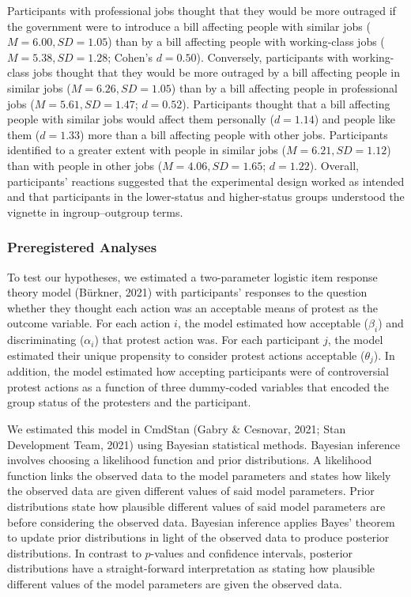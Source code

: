 \documentclass[twocolumn, 11pt, letterpaper]{article}
\begin{document}
Participants with professional jobs thought that they would be more
outraged if the government were to introduce a bill affecting people
with similar jobs (\(M = 6.00, SD = 1.05\)) than by a bill affecting
people with working-class jobs (\(M = 5.38, SD = 1.28\); Cohen's
\(d = 0.50\)). Conversely, participants with working-class jobs thought
that they would be more outraged by a bill affecting people in similar
jobs (\(M = 6.26, SD = 1.05\)) than by a bill affecting people in
professional jobs (\(M = 5.61, SD = 1.47\); \(d = 0.52\)). Participants
thought that a bill affecting people with similar jobs would affect them
personally (\(d = 1.14\)) and people like them (\(d = 1.33\)) more than
a bill affecting people with other jobs. Participants identified to a
greater extent with people in similar jobs (\(M = 6.21, SD = 1.12\))
than with people in other jobs (\(M = 4.06, SD = 1.65\); \(d = 1.22\)).
Overall, participants' reactions suggested that the experimental design
worked as intended and that participants in the lower-status and
higher-status groups understood the vignette in ingroup--outgroup terms.

\hypertarget{preregistered-analyses}{%
\subsubsection{Preregistered Analyses}\label{preregistered-analyses}}

To test our hypotheses, we estimated a two-parameter logistic item
response theory model (Bürkner, 2021) with participants' responses to
the question whether they thought each action was an acceptable means of
protest as the outcome variable. For each action \(i\), the model
estimated how acceptable (\(\beta_i\)) and discriminating (\(\alpha_i\))
that protest action was. For each participant \(j\), the model estimated
their unique propensity to consider protest actions acceptable
(\(\theta_j\)). In addition, the model estimated how accepting
participants were of controversial protest actions as a function of
three dummy-coded variables that encoded the group status of the
protesters and the participant.

We estimated this model in CmdStan (Gabry \& Cesnovar, 2021; Stan
Development Team, 2021) using Bayesian statistical methods. Bayesian
inference involves choosing a likelihood function and prior
distributions. A likelihood function links the observed data to the
model parameters and states how likely the observed data are given
different values of said model parameters. Prior distributions state how
plausible different values of said model parameters are before
considering the observed data. Bayesian inference applies Bayes' theorem
to update prior distributions in light of the observed data to produce
posterior distributions. In contrast to \(p\)-values and confidence
intervals, posterior distributions have a straight-forward
interpretation as stating how plausible different values of the model
parameters are given the observed data.
\end{document}

